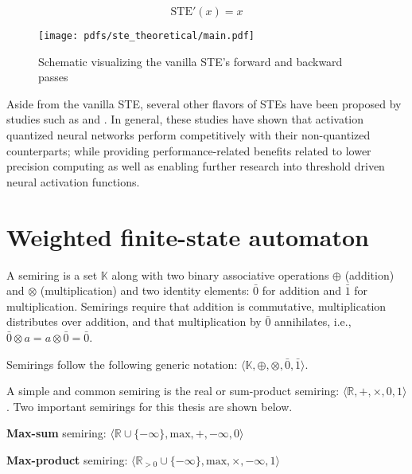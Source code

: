 \begin{equation}
  \label{eq:ste-backward}
  \text{STE}'(x)= x
\end{equation}

\begin{figure}[t]
  \centering
  \texttt{[image: pdfs/ste\_theoretical/main.pdf]}
  \caption{Schematic visualizing the vanilla STE's forward and backward passes}
  \label{fig:straight-through-estimator}
\end{figure}

Aside from the vanilla STE, several other flavors of STEs have been proposed by studies such as \citet{courbariaux2016binarized} and \citet{yin2019understanding}. In general, these studies have shown that activation quantized neural networks perform competitively with their non-quantized counterparts; while providing performance-related benefits related to lower precision computing as well as enabling further research into threshold driven neural activation functions.

\section{Weighted finite-state automaton}

\label{section:wfsa}

\begin{definition}
  A semiring is a set $\mathbb{K}$ along with two binary associative operations $\oplus$ (addition) and $\otimes$ (multiplication) and two identity elements: $\bar{0}$ for addition and $\bar{1}$ for multiplication. Semirings require that addition is commutative, multiplication distributes over addition, and that multiplication by $\bar{0}$ annihilates, i.e., $\bar{0} \otimes a = a \otimes \bar{0} = \bar{0}$.

\begin{remark}
  Semirings follow the following generic notation: $\langle \mathbb{K}, \oplus, \otimes, \bar{0}, \bar{1} \rangle$.
\end{remark}

\begin{remark}
  A simple and common semiring is the real or sum-product semiring: $\langle \mathbb{R}, +, \times, 0, 1 \rangle$. Two important semirings for this thesis are shown below.
\end{remark}

\begin{remark}
  \textbf{Max-sum} semiring: $\langle \mathbb{R} \cup \{-\infty\}, \text{max}, +, -\infty, 0 \rangle$
\end{remark}

\begin{remark}
  \textbf{Max-product} semiring: $\langle \mathbb{R}_{>0} \cup \{-\infty\}, \text{max}, \times, -\infty, 1 \rangle$
\end{remark}

\end{definition}

